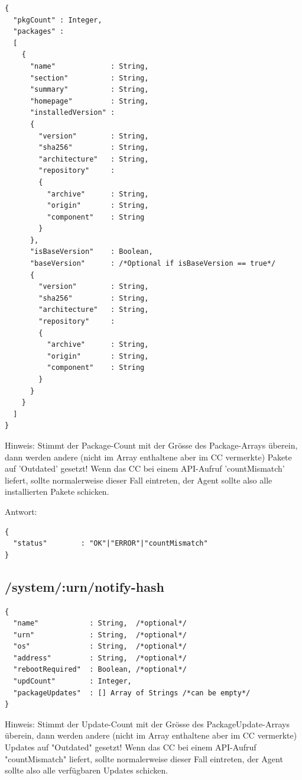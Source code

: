 \begin{verbatim}
{
  "pkgCount" : Integer,
  "packages" :
  [
    {
      "name"             : String,
      "section"          : String,
      "summary"          : String,
      "homepage"         : String,
      "installedVersion" :
      {
        "version"        : String,
        "sha256"         : String,
        "architecture"   : String,
        "repository"     :
        {
          "archive"      : String,
          "origin"       : String,
          "component"    : String
        }
      },
      "isBaseVersion"    : Boolean,
      "baseVersion"      : /*Optional if isBaseVersion == true*/
      {
        "version"        : String,
        "sha256"         : String,
        "architecture"   : String,
        "repository"     :
        {
          "archive"      : String,
          "origin"       : String,
          "component"    : String
        }
      }
    }
  ]
}
\end{verbatim}

Hinweis: Stimmt der Package-Count mit der Grösse des Package-Arrays überein, dann werden andere (nicht im Array enthaltene aber im CC vermerkte) Pakete auf 'Outdated' gesetzt! Wenn das CC bei einem API-Aufruf 'countMismatch' liefert, sollte normalerweise dieser Fall eintreten, der Agent sollte also alle installierten Pakete schicken.


Antwort:

\begin{verbatim}
{
  "status"        : "OK"|"ERROR"|"countMismatch" 
}
\end{verbatim}

\subsection*{/system/:urn/notify-hash}

\begin{verbatim}
{
  "name"            : String,  /*optional*/
  "urn"             : String,  /*optional*/
  "os"              : String,  /*optional*/
  "address"         : String,  /*optional*/
  "rebootRequired"  : Boolean, /*optional*/
  "updCount"        : Integer,
  "packageUpdates"  : [] Array of Strings /*can be empty*/
}
\end{verbatim}

Hinweis: Stimmt der Update-Count mit der Grösse des PackageUpdate-Arrays überein, dann werden andere (nicht im Array enthaltene aber im CC vermerkte) Updates auf "Outdated" gesetzt! Wenn das CC bei einem API-Aufruf "countMismatch" liefert, sollte normalerweise dieser Fall eintreten, der Agent sollte also alle verfügbaren Updates schicken.



